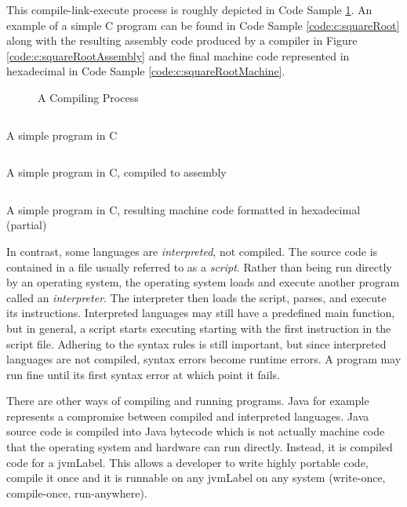 This compile-link-execute process is roughly depicted in Code Sample \ref{figure:compilingProcess}.  An 
example of a simple C program can be found in Code Sample \ref{code:c:squareRoot}
along with the resulting assembly code produced by a compiler in Figure
\ref{code:c:squareRootAssembly} and the final machine code represented
in hexadecimal in Code Sample \ref{code:c:squareRootMachine}.

\begin{figure}
\centering

\caption{A Compiling Process}
\label{figure:compilingProcess}
\end{figure}

\begin{listing}
\inputminted{c}{figures/squareRoot/squareRoot.c}
\caption{A simple program in C}
\label{code:c:squareRoot}
\end{listing}

\begin{listing}
\centering
\inputminted[fontsize=\tiny]{text}{figures/squareRoot/squareRoot.s}
\caption{A simple program in C, compiled to assembly}
\label{code:c:squareRootAssembly}
\end{listing}

\begin{listing}
\centering
\inputminted[fontsize=\scriptsize]{text}{figures/squareRoot/squareRoot.partial.txt}
\caption{A simple program in C, resulting machine code formatted in hexadecimal (partial)}
\label{code:c:squareRootMachine}
\end{listing}

In contrast, some languages are \emph{interpreted}, 
not compiled.  The source code is contained in a file usually referred
to as a \emph{script}.  Rather than being run directly by an operating system, 
the operating system loads and execute another program called an \emph{interpreter}.
The interpreter then loads the script, parses, and execute its instructions.
Interpreted languages may still have a predefined main function, but in 
general, a script starts executing starting with the first instruction in the
script file.  Adhering to the syntax rules is still important, but since interpreted
languages are not compiled, syntax errors become runtime errors.  A program
may run fine until its first syntax error at which point it fails.  

There are other ways of compiling and running programs.  Java for example
represents a compromise between compiled and interpreted languages.
Java source code is compiled into Java bytecode which is not actually machine
code that the operating system and hardware can run directly.  Instead, it is
compiled code for a \gls{jvmLabel}.  This allows a developer to write highly
portable code, compile it once and it is runnable on any \gls{jvmLabel} 
on any system (write-once, compile-once, run-anywhere).  

